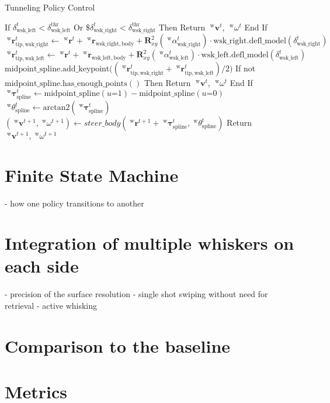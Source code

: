 \begin{algorithm}
    \caption{Tunneling Policy Control}
    \label{alg:tunneling_policy}
    \begin{algorithmic}
        \State If \(\delta_{\mathrm{wsk\_left}}^{t} < \delta_{\mathrm{wsk\_left}}^{\mathrm{thr}}\) Or \(\$\delta_{\mathrm{wsk\_right}}^{t} < \delta_{\mathrm{wsk\_right}}^{\mathrm{thr}}\) Then
        \State \quad Return \(\;^{\mathrm{w}}\boldsymbol{v}^{t}\), \(\;^{\mathrm{w}}\omega^{t}\)
        \State End If
        \State
        \State \(\;^{\mathrm{w}}\boldsymbol{r}_{\mathrm{tip, wsk\_right}}^{t} \gets \;^{\mathrm{w}}\boldsymbol{r}^{t} + \;^{\mathrm{w}}\boldsymbol{r}_{\mathrm{wsk\_right, body}} + \boldsymbol{R}_{xy}^{2}(\; ^{\mathrm{w}}\alpha_{\mathrm{wsk\_right}}^{t}) \cdot \mathrm{wsk\_right.defl\_model}(\delta_{\mathrm{wsk\_right}}^{t})\)
        \State \(\;^{\mathrm{w}}\boldsymbol{r}_{\mathrm{tip, wsk\_left}}^{t} \gets \;^{\mathrm{w}}\boldsymbol{r}^{t} + \;^{\mathrm{w}}\boldsymbol{r}_{\mathrm{wsk\_left, body}} + \boldsymbol{R}_{xy}^{2}(\; ^{\mathrm{w}}\alpha_{\mathrm{wsk\_left}}^{t}) \cdot \mathrm{wsk\_left.defl\_model}(\delta_{\mathrm{wsk\_left}}^{t})\)
        \State \(\mathrm{midpoint\_spline.add\_keypoint}\big((\;^{\mathrm{w}}\boldsymbol{r}_{\mathrm{tip, wsk\_right}}^{t} + \;^{\mathrm{w}}\boldsymbol{r}_{\mathrm{tip, wsk\_left}}^{t}) / 2\big)\)
        \State If not \(\mathrm{midpoint\_spline.has\_enough\_points()}\) Then
        \State \quad Return \(\;^{\mathrm{w}}\boldsymbol{v}^{t}\), \(\;^{\mathrm{w}}\omega^{t}\)
        \State End If
        \State
        \State \(\;^{\mathrm{w}}\boldsymbol{\tau}_{\mathrm{spline}}^{t} \gets \mathrm{midpoint\_spline}(u\mathord{=}1) - \mathrm{midpoint\_spline}(u\mathord{=}0)\)
        \State \(\;^{\mathrm{w}}\theta_{\mathrm{spline}}^{t} \gets \mathrm{arctan2}(\;^{\mathrm{w}}\boldsymbol{\tau}_{\mathrm{spline}}^{t})\)
        \State
        \State \((\;^{\mathrm{w}}\boldsymbol{v}^{t+1}, \;^{\mathrm{w}}\omega^{t+1}) \gets steer\_body(\;^{\mathrm{w}}\boldsymbol{r}^{t+1} + \;^{\mathrm{w}}\boldsymbol{\tau}_{\mathrm{spline}}^{t},\;^{\mathrm{w}}\theta_{\mathrm{spline}}^{t})\)
        \State Return \(\;^{\mathrm{w}}\boldsymbol{v}^{t+1}, \;^{\mathrm{w}}\omega^{t+1}\)
    \end{algorithmic}
\end{algorithm}


\section{Finite State Machine}
- how one policy transitions to another


\section{Integration of multiple whiskers on each side}
- precision of the surface resolution
- single shot swiping without need for retrieval
- active whisking


\section{Comparison to the baseline}


\section{Metrics}


\section{}
